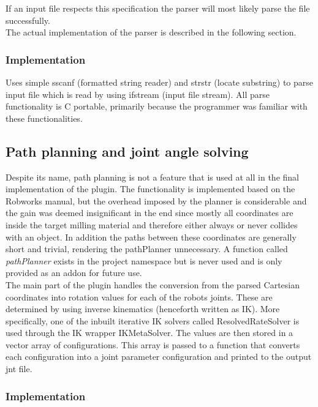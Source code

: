 If an input file respects this specification the parser will most likely parse the file successfully.\\

The actual implementation of the parser is described in the following section.

\subsubsection{Implementation}
\label{sec:parserImpl}
Uses simple sscanf (formatted string reader) and strstr (locate substring) to parse input file which is read by using ifstream (input file stream). All parse functionality is C portable, primarily because the programmer was familiar with these functionalities.

\subsection{Path planning and joint angle solving}
\label{sec:pathplanning}
Despite its name, path planning is not a feature that is used at all in the final implementation of the plugin. The functionality is implemented based on the Robworks manual, but the overhead imposed by the planner is considerable and the gain was deemed insignificant in the end since mostly all coordinates are inside the target milling material and therefore either always or never collides with an object. In addition the paths between these coordinates are generally short and trivial, rendering the pathPlanner unnecessary. A function called \textit{pathPlanner} exists in the project namespace but is never used and is only provided as an addon for future use.\\

The main part of the plugin handles the conversion from the parsed Cartesian coordinates into rotation values for each of the robots joints. These are determined by using inverse kinematics (henceforth written as IK). More specifically, one of the inbuilt iterative IK solvers called ResolvedRateSolver is used through the IK wrapper IKMetaSolver. The values are then stored in a vector array of configurations. This array is passed to a function that converts each configuration into a joint parameter configuration and printed to the output jnt file.

\subsubsection{Implementation}
\label{sec:pathplanningImpl}

